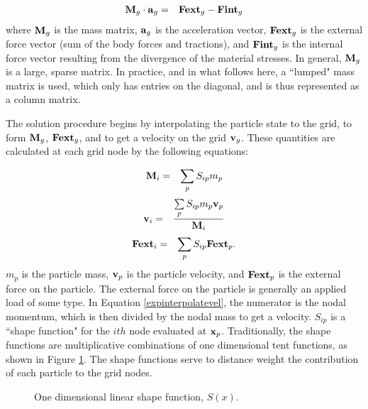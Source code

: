 \begin{eqnarray}
	\mbox{\ensuremath{\mathbf{M}}}_g \cdot \mbox{\ensuremath{\mathbf{a}}}_g &=& \mbox{\ensuremath{\mathbf{Fext}}}_g - \mbox{\ensuremath{\mathbf{Fint}}}_g  
\label{newton2}
\end{eqnarray}
where $\mbox{\ensuremath{\mathbf{M}}}_g$ is the mass matrix, $\mbox{\ensuremath{\mathbf{a}}}_g$ is the 
acceleration vector,
$\mbox{\ensuremath{\mathbf{Fext}}}_g$ is the external force vector (sum of the body 
forces and
tractions), and $\mbox{\ensuremath{\mathbf{Fint}}}_g$ is the internal force vector 
resulting from
the divergence of the material stresses.  In general, $\mbox{\ensuremath{\mathbf{M}}}_g$ 
is a 
large, sparse matrix.  In practice, and in what follows here, a 
``lumped"
mass matrix is used, which only has entries on the diagonal, and 
is thus
represented as a column matrix.

The solution procedure begins by interpolating the particle 
state to the
grid, to form $\mbox{\ensuremath{\mathbf{M}}}_g$, $\mbox{\ensuremath{\mathbf{Fext}}}_g$, and to get a velocity 
on the grid
$\mbox{\ensuremath{\mathbf{v}}}_g$.  These quantities are calculated at each grid
node by the following equations:

\begin{eqnarray}
        \mbox{\ensuremath{\mathbf{M}}}_i &=& \sum_{p} S_{ip} m_p  
\label{expinterpolatemass}
\end{eqnarray}
\begin{eqnarray}
        \mbox{\ensuremath{\mathbf{v}}}_i &=& \frac{\sum\limits_{p} S_{ip} m_p 
\mbox{\ensuremath{\mathbf{v}}}_p}{\mbox{\ensuremath{\mathbf{M}}}_i} \label{expinterpolatevel}
\end{eqnarray}
\begin{eqnarray}
        \mbox{\ensuremath{\mathbf{Fext}}}_i &=& \sum_{p} S_{ip} \mbox{\ensuremath{\mathbf{Fext}}}_p. 
\label{expinterpolateFext}
\end{eqnarray}
$m_p$ is the particle
mass, $\mbox{\ensuremath{\mathbf{v}}}_p$ is the particle velocity, and $\mbox{\ensuremath{\mathbf{Fext}}}_p$ is 
the external
force on the particle.  The external force on the particle is 
generally an applied load of some type.  In Equation 
\ref{expinterpolatevel}, the numerator is the nodal momentum, 
which is then divided by the nodal mass to get a velocity.  
$S_{ip}$ is a ``shape function" for the $ith$ node
evaluated at $\mbox{\ensuremath{\mathbf{x}}}_p$.  Traditionally, the shape functions are 
multiplicative
combinations of one dimensional tent functions, as shown in
Figure \ref{fig-Sip}.  The shape functions serve to distance 
weight the contribution of each particle to the grid nodes.  

\begin{figure}[bh]
  \hspace{1.75in}
  \caption{\label{fig-Sip} One dimensional linear shape function, 
           $S(x)$.}
\end{figure}

